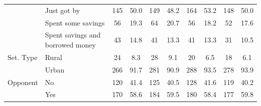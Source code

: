 \documentclass[11pt, ngerman,english,a4]{article}
\begin{document}
\begin{table}[!htbp]
{\begin{tabular}[t]{llcccccccc}
 & Just got by & 145 & 50.0 & 149 & 48.2 & 164 & 53.2 & 148 & 50.0\\
 & Spent some savings & 56 & 19.3 & 64 & 20.7 & 56 & 18.2 & 52 & 17.6\\
 & Spent savings and
borrowed money & 43 & 14.8 & 41 & 13.3 & 41 & 13.3 & 31 & 10.5\\
Set. Type & Rural & 24 & 8.3 & 28 & 9.1 & 20 & 6.5 & 18 & 6.1\\
 & Urban & 266 & 91.7 & 281 & 90.9 & 288 & 93.5 & 278 & 93.9\\
Opponent & No & 120 & 41.4 & 125 & 40.5 & 128 & 41.6 & 119 & 40.2\\
 & Yes & 170 & 58.6 & 184 & 59.5 & 180 & 58.4 & 177 & 59.8\\
\bottomrule
\end{tabular}}
\end{table}
\end{document}
